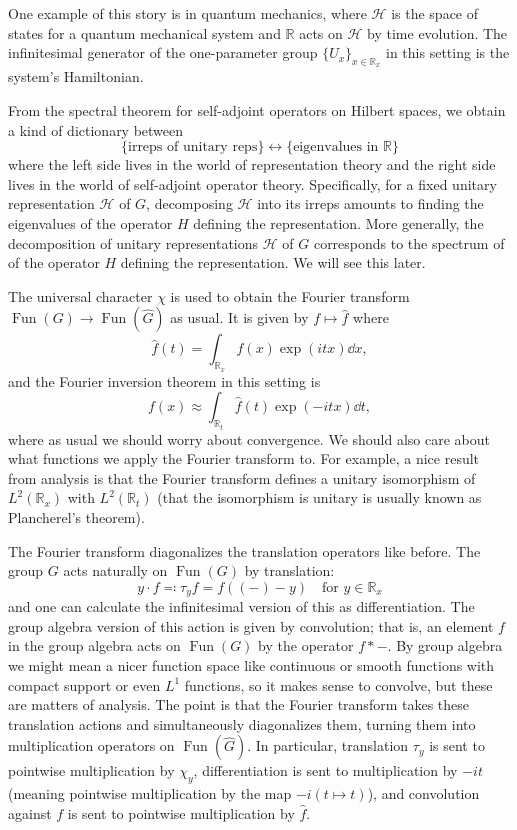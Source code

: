 \documentclass[11pt,leqno]{article}
\theoremstyle{plain}
\theoremstyle{definition}
\numberwithin{equation}{section}
\numberwithin{lem}{section}
\DeclareMathOperator{\Fun}{Fun}
\begin{document}
One example of this story is in quantum mechanics, where $\mathcal H$ is the space of states for a quantum mechanical system and $\mathbb R$ acts on $\mathcal H$ by time evolution. The infinitesimal generator of the one-parameter group $\{U_x\}_{x\in\mathbb R_x}$ in this setting is the system's Hamiltonian.

From the spectral theorem for self-adjoint operators on Hilbert spaces, we obtain a kind of dictionary between
\[\{\text{irreps of unitary reps}\}\longleftrightarrow\{\text{eigenvalues in $\mathbb R$}\}\]
where the left side lives in the world of representation theory and the right side lives in the world of self-adjoint operator theory. Specifically, for a fixed unitary representation $\mathcal H$ of $G$, decomposing $\mathcal H$ into its irreps amounts to finding the eigenvalues of the operator $H$ defining the representation. More generally, the decomposition of unitary representations $\mathcal H$ of $G$ corresponds to the spectrum of of the operator $H$ defining the representation. We will see this later.

The universal character $\chi$ is used to obtain the Fourier transform $\Fun(G)\to \Fun(\widehat G)$ as usual. It is given by $f\mapsto \hat f$ where
\[\hat f(t) = \int_{\mathbb R_x}f(x)\exp(itx)\dd x,\]
and the Fourier inversion theorem in this setting is 
\[f(x)\approx \int_{\mathbb R_t} \hat f(t)\exp(-itx)\dd t,\]
where as usual we should worry about convergence. We should also care about what functions we apply the Fourier transform to. For example, a nice result from analysis is that the Fourier transform defines a unitary isomorphism of $L^2(\mathbb R_x)$ with $L^2(\mathbb R_t)$ (that the isomorphism is unitary is usually known as Plancherel's theorem).

The Fourier transform diagonalizes the translation operators like before. The group $G$ acts naturally on $\Fun(G)$ by translation:
\[y\cdot f \eqqcolon \tau_yf = f((-)-y)\quad \text{for }y\in\mathbb R_x\]
and one can calculate the infinitesimal version of this as differentiation. The group algebra version of this action is given by convolution; that is, an element $f$ in the group algebra acts on $\Fun(G)$ by the operator $f\ast -$. By group algebra we might mean a nicer function space like continuous or smooth functions with compact support or even $L^1$ functions, so it makes sense to convolve, but these are matters of analysis. The point is that the Fourier transform takes these translation actions and simultaneously diagonalizes them, turning them into multiplication operators on $\Fun(\widehat G)$. In particular, translation $\tau_y$ is sent to pointwise multiplication by $\chi_y$, differentiation is sent to multiplication by $-it$ (meaning pointwise multiplication by the map $-i(t\mapsto t)$), and convolution against $f$ is sent to pointwise multiplication by $\hat f$.
\end{document}

